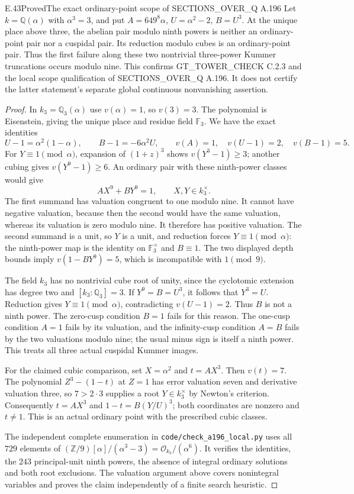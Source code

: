 \begin{result}{E.43}{Proved}{The exact ordinary-point scope of SECTIONS\_OVER\_Q A.196}
Let $k=\mathbb Q(\alpha)$ with $\alpha^3=3$, and put
$A=649^8\alpha$, $U=\alpha^2-2$, $B=U^3$.
At the unique place above three, the abelian pair modulo ninth powers
is neither an ordinary-point pair nor a cuspidal pair. Its reduction
modulo cubes is an ordinary-point pair. Thus the first failure along
these two nontrivial three-power Kummer truncations occurs modulo
nine. This confirms GT\_TOWER\_CHECK C.2.3 and the local scope
qualification of SECTIONS\_OVER\_Q A.196. It does not certify the
latter statement's separate global continuous nonvanishing assertion.
\end{result}
\begin{proof}
In $k_3=\mathbb Q_3(\alpha)$ use $v(\alpha)=1$, so $v(3)=3$.
The polynomial is Eisenstein, giving the unique place and residue
field $\mathbb F_3$. We have the exact identities
\[
 U-1=\alpha^2(1-\alpha),\qquad B-1=-6\alpha^2U,
 \qquad v(A)=1,\quad v(U-1)=2,\quad v(B-1)=5.
\]
For $Y\equiv1\pmod\alpha$, expansion of $(1+z)^3$ shows
$v(Y^3-1)\ge3$; another cubing gives $v(Y^9-1)\ge6$.
An ordinary pair with these ninth-power classes would give
\[
 AX^9+BY^9=1,\qquad X,Y\in k_3^\times.
\]
The first summand has valuation congruent to one modulo nine. It
cannot have negative valuation, because then the second would have
the same valuation, whereas its valuation is zero modulo nine.
It therefore has positive valuation. The second summand is a unit,
so $Y$ is a unit, and reduction forces $Y\equiv1\pmod\alpha$:
the ninth-power map is the identity on $\mathbb F_3^\times$ and
$B\equiv1$. The two displayed depth bounds imply
$v(1-BY^9)=5$, which is incompatible with $1\pmod9$.

The field $k_3$ has no nontrivial cube root of unity, since the
cyclotomic extension has degree two and $[k_3:\mathbb Q_3]=3$.
If $Y^9=B=U^3$, it follows that $Y^3=U$. Reduction gives
$Y\equiv1\pmod\alpha$, contradicting $v(U-1)=2$.
Thus $B$ is not a ninth power. The zero-cusp condition $B=1$
fails for this reason. The one-cusp condition $A=1$ fails by its
valuation, and the infinity-cusp condition $A=B$ fails by the two
valuations modulo nine; the usual minus sign is itself a ninth
power. This treats all three actual cuspidal Kummer images.

For the claimed cubic comparison, set $X=\alpha^2$ and
$t=AX^3$. Then $v(t)=7$. The polynomial $Z^3-(1-t)$ at $Z=1$
has error valuation seven and derivative valuation three, so
$7>2\cdot3$ supplies a root $Y\in k_3^\times$ by Newton's
criterion. Consequently
$t=AX^3$ and $1-t=B(Y/U)^3$; both coordinates are nonzero and
$t\ne1$. This is an actual ordinary point with the prescribed
cubic classes.

The independent complete enumeration in
\texttt{code/check\_a196\_local.py} uses all $729$ elements of
$(\mathbb Z/9)[\alpha]/(\alpha^3-3)=\mathcal O_{k_3}/(\alpha^6)$.
It verifies the identities, the $243$ principal-unit ninth powers,
the absence of integral ordinary solutions and both root exclusions.
The valuation argument above covers nonintegral variables and proves
the claim independently of a finite search heuristic.
\end{proof}

